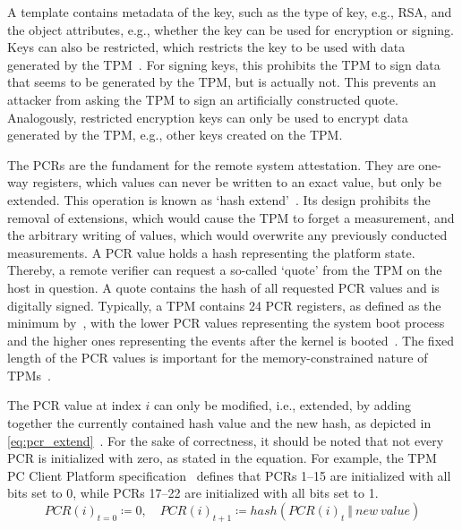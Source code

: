 A template contains metadata of the key, such as the type of key, e.g., RSA, and the object attributes, e.g., whether the key can be used for encryption or signing.
Keys can also be restricted, which restricts the key to be used with data generated by the TPM~\cite{tpm20}.
For signing keys, this prohibits the TPM to sign data that seems to be generated by the TPM, but is actually not.
This prevents an attacker from asking the TPM to sign an artificially constructed quote.
Analogously, restricted encryption keys can only be used to encrypt data generated by the TPM, e.g., other keys created on the TPM\@.


The \acp{PCR} are the fundament for the remote system attestation. They are one-way registers, which values can never be written to an exact value, but only be extended.
This operation is known as `hash extend'~\cite{Arthur2015}.
Its design prohibits the removal of extensions, which would cause the TPM to forget a measurement, and the arbitrary writing of values, which would overwrite any previously conducted measurements.
A PCR value holds a hash representing the platform state.
Thereby, a remote verifier can request a so-called `quote' from the TPM on the host in question.
A quote contains the hash of all requested PCR values and is digitally signed.
Typically, a TPM contains 24 PCR registers, as defined as the minimum by~\cite{tcgPcClient}, with the lower PCR values representing the system boot process and the higher ones representing the events after the kernel is booted~\cite{Arthur2015}.
The fixed length of the \ac{PCR} values is important for the memory-constrained nature of TPMs~\cite{Arthur2015}.

The PCR value at index \(i\) can only be modified, i.e., extended, by adding together the currently contained hash value and the new hash, as depicted in \autoref{eq:pcr_extend}~\cite{tpm20}.
For the sake of correctness, it should be noted that not every PCR is initialized with zero, as stated in the equation.
For example, the TPM PC Client Platform specification~\cite{tcgPcClient} defines that PCRs 1--15 are initialized with all bits set to 0, while PCRs 17--22 are initialized with all bits set to 1.
\begin{equation}
  \label{eq:pcr_extend}
PCR(i)_{t=0} \coloneqq 0,\quad PCR(i)_{t+1} \coloneqq hash(PCR(i)_t\ \Vert\ new\ value)
\end{equation}

